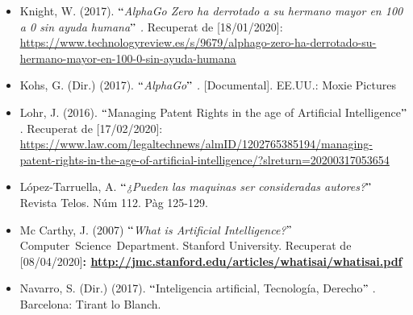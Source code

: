 \documentclass[12pt]{article}
\begin{document}
\begin{itemize}
\vspace{\baselineskip}
	\item Knight, W. (2017). $``$\textit{AlphaGo Zero ha derrotado a su hermano mayor en 100 a 0 sin ayuda humana$"$ . } Recuperat de [18/01/2020]: \href{https://www.technologyreview.es/s/9679/alphago-zero-ha-derrotado-su-hermano-mayor-en-100-0-sin-ayuda-humana}{\textcolor[HTML]{0000FF}{\ul{https://www.technologyreview.es/s/9679/alphago-zero-ha-derrotado-su-hermano-mayor-en-100-0-sin-ayuda-humana}}}\par


\vspace{\baselineskip}
	\item Kohs, G. (Dir.) (2017). \textit{$``$AlphaGo$"$ . }[Documental].\textit{ }EE.UU.: Moxie Pictures\par


\vspace{\baselineskip}
	\item Lohr, J. (2016). $``$Managing Patent Rights in the age of Artificial Intelligence$"$ . Recuperat de [17/02/2020]: \href{https://www.law.com/legaltechnews/almID/1202765385194/managing-patent-rights-in-the-age-of-artificial-intelligence/?slreturn=20200317053654}{https://www.law.com/legaltechnews/almID/1202765385194/managing-patent-rights-in-the-age-of-artificial-intelligence/?slreturn=20200317053654}\par


\vspace{\baselineskip}
	\item López-Tarruella, A. \textit{$``$¿Pueden las maquinas ser consideradas autores?}$"$  Revista Telos. Núm 112. Pàg 125-129.\par


\vspace{\baselineskip}
	\item Mc Carthy, J. (2007)\textit{ $``$What is Artificial Intelligence?$"$  }Computer\ Science\ Department. Stanford University.   Recuperat de [08/04/2020]\textbf{:\textit{ \href{http://jmc.stanford.edu/articles/whatisai/whatisai.pdf}{}}\textcolor[HTML]{0000FF}{\ul{http://jmc.stanford.edu/articles/whatisai/whatisai.pdf}}}\par


\vspace{\baselineskip}
	\item Navarro, S. (Dir.) (2017). $``$Inteligencia artificial, Tecnología, Derecho$"$ . Barcelona: Tirant lo Blanch.\par



\end{itemize}
\end{document}
